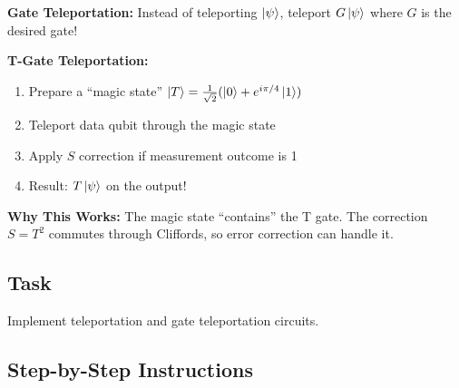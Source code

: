 \documentclass[11pt,a4paper]{article}
\begin{document}
\textbf{Gate Teleportation:}
Instead of teleporting $\ket{\psi}$, teleport $G\ket{\psi}$ where $G$ is the desired gate!

\textbf{T-Gate Teleportation:}
\begin{enumerate}
    \item Prepare a ``magic state'' $\ket{T} = \frac{1}{\sqrt{2}}(\ket{0} + e^{i\pi/4}\ket{1})$
    \item Teleport data qubit through the magic state
    \item Apply $S$ correction if measurement outcome is 1
    \item Result: $T\ket{\psi}$ on the output!
\end{enumerate}

\textbf{Why This Works:} The magic state ``contains'' the T gate. The correction $S = T^2$ commutes through Cliffords, so error correction can handle it.

\subsection*{Task}
Implement teleportation and gate teleportation circuits.

\subsection*{Step-by-Step Instructions}
\end{document}
